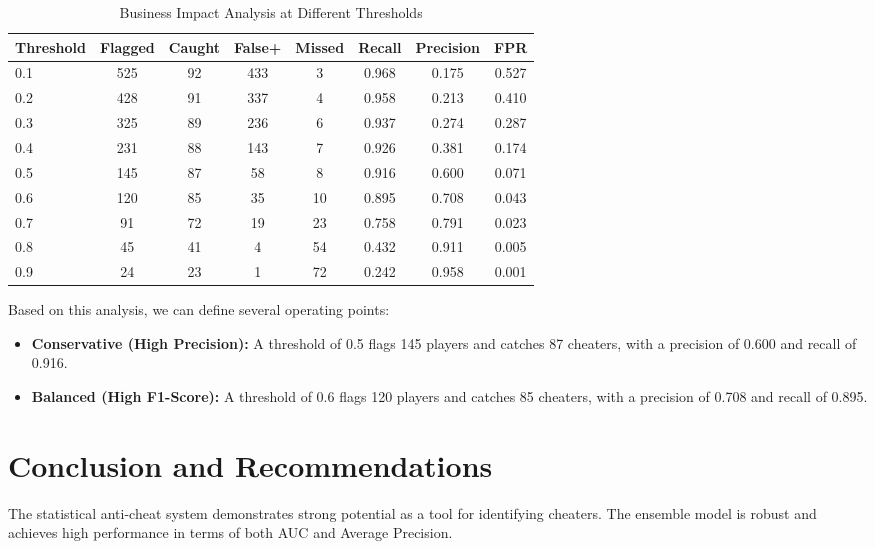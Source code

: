 \documentclass{article}
\begin{document}
\begin{table}[H]
    \centering
    \caption{Business Impact Analysis at Different Thresholds}
    \label{tab:business}
    \begin{tabular}{@{}lccccccc@{}}
    \toprule
    Threshold & Flagged & Caught & False+ & Missed & Recall & Precision & FPR \\
    \midrule
    0.1 & 525 & 92 & 433 & 3 & 0.968 & 0.175 & 0.527 \\
    0.2 & 428 & 91 & 337 & 4 & 0.958 & 0.213 & 0.410 \\
    0.3 & 325 & 89 & 236 & 6 & 0.937 & 0.274 & 0.287 \\
    0.4 & 231 & 88 & 143 & 7 & 0.926 & 0.381 & 0.174 \\
    0.5 & 145 & 87 & 58 & 8 & 0.916 & 0.600 & 0.071 \\
    0.6 & 120 & 85 & 35 & 10 & 0.895 & 0.708 & 0.043 \\
    0.7 & 91 & 72 & 19 & 23 & 0.758 & 0.791 & 0.023 \\
    0.8 & 45 & 41 & 4 & 54 & 0.432 & 0.911 & 0.005 \\
    0.9 & 24 & 23 & 1 & 72 & 0.242 & 0.958 & 0.001 \\
    \bottomrule
    \end{tabular}
\end{table}

Based on this analysis, we can define several operating points:
\begin{itemize}
    \item \textbf{Conservative (High Precision):} A threshold of 0.5 flags 145 players and catches 87 cheaters, with a precision of 0.600 and recall of 0.916.
    \item \textbf{Balanced (High F1-Score):} A threshold of 0.6 flags 120 players and catches 85 cheaters, with a precision of 0.708 and recall of 0.895.
\end{itemize}

\section{Conclusion and Recommendations}
The statistical anti-cheat system demonstrates strong potential as a tool for identifying cheaters. The ensemble model is robust and achieves high performance in terms of both AUC and Average Precision.
\end{document}
